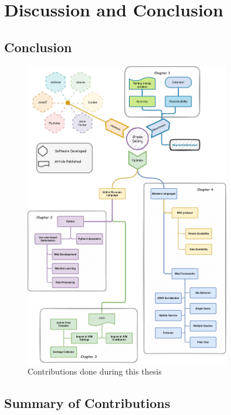 \newpage
\chapter{Discussion and Conclusion}
\label{chapter:Discussion_Future_Work}

\section{Conclusion}
\label{section:Conclusion}

\begin{figure}[!h]

      \centering
      \includegraphics[width=0.8\textwidth,height=\textheight,keepaspectratio]{chapters/thesis_contributions.pdf}
      \caption{Contributions done during this thesis }
      \label{fig:thesis_contributions}
  \end{figure}

\section{Summary of Contributions}
\label{section:SummaryofContributions}

